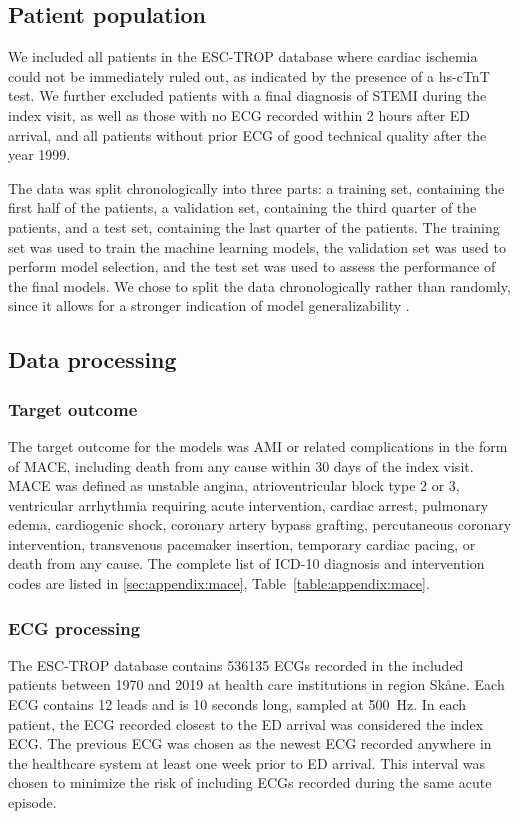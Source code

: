 \documentclass[preprint]{elsarticle}
\begin{document}
\subsection{Patient population}
We included all patients in the ESC-TROP database where cardiac ischemia could not be immediately ruled out, as indicated by the presence of a hs-cTnT test. We further excluded patients with a final diagnosis of STEMI during the index visit, as well as those with no ECG recorded within 2 hours after ED arrival, and all patients without prior ECG of good technical quality after the year 1999. 

The data was split chronologically into three parts: a training set, containing the first half of the patients, a validation set, containing the third quarter of the patients, and a test set, containing the last quarter of the patients. The training set was used to train the machine learning models, the validation set was used to perform model selection, and the test set was used to assess the performance of the final models. We chose to split the data chronologically rather than randomly, since it allows for a stronger indication of model generalizability \citep{steyerberg2009}.


\subsection{Data processing}
\subsubsection{Target outcome}
The target outcome for the models was AMI or related complications in the form of MACE, including death from any cause within 30 days of the index visit. MACE was defined as unstable angina, atrioventricular block type 2 or 3, ventricular arrhythmia requiring acute intervention, cardiac arrest, pulmonary edema, cardiogenic shock, coronary artery bypass grafting, percutaneous coronary intervention, transvenous pacemaker insertion, temporary cardiac pacing, or death from any cause. The complete list of ICD-10 diagnosis and intervention codes are listed in \ref{sec:appendix:mace}, Table~\ref{table:appendix:mace}.

\subsubsection{ECG processing}
The ESC-TROP database contains 536135 ECGs recorded in the included patients between 1970 and 2019 at health care institutions in region Sk\aa{}ne. Each ECG contains 12 leads and is 10 seconds long, sampled at \SI{500}{\hertz}. In each patient, the ECG recorded closest to the ED arrival was considered the index ECG. The previous ECG was chosen as the newest ECG recorded anywhere in the healthcare system at least one week prior to ED arrival. This interval was chosen to minimize the risk of including ECGs recorded during the same acute episode. 
\end{document}
